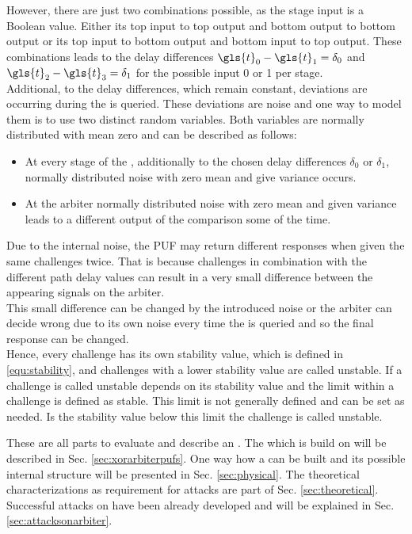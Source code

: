 However, there are just two combinations possible, as the stage input is a Boolean value.
Either its top input to top output and bottom output to bottom output or its top input to bottom output and bottom input to top output.
These combinations leads to the delay differences $\gls{t}_0 - \gls{t}_1 = \delta_0$ and $\gls{t}_2 - \gls{t}_3 = \delta_1$ for the possible input 0 or 1 per stage.\\
Additional, to the delay differences, which remain constant, deviations are occurring during the \apuf is queried.
These deviations are noise and one way to model them is to use two distinct random variables.
Both variables are normally distributed with mean zero and can be described as follows:

\begin{itemize}
\item At every stage of the \apuf, additionally to the chosen delay differences $\delta_0$ or $\delta_1$, normally distributed noise with zero mean and give variance occurs.
\item At the arbiter normally distributed noise with zero mean and given variance leads to a different output of the comparison some of the time.
\end{itemize}

Due to the internal noise, the PUF may return different responses when given the same challenges twice.
That is because challenges in combination with the different path delay values can result in a very small difference between the appearing signals on the arbiter.\\
This small difference can be changed by the introduced noise or the arbiter can decide wrong due to its own noise every time the \apuf is queried and so the final response can be changed.\\
Hence, every challenge has its own stability value, which is defined in \ref{equ:stability}, and challenges with a lower stability value are called unstable.
If a challenge is called unstable depends on its stability value and the limit within a challenge is defined as stable.
This limit is not generally defined and can be set as needed.
Is the stability value below this limit the challenge is called unstable.

These are all parts to evaluate and describe an \apuf.
The \xpuf which is build on \apufs will be described in Sec. \ref{sec:xorarbiterpufs}.
One way how a \apuf can be built and its possible internal structure will be presented in Sec. \ref{sec:physical}.
The theoretical characterizations as requirement for attacks are part of Sec. \ref{sec:theoretical}.
Successful attacks on \apufs have been already developed and will be explained in Sec. \ref{sec:attacksonarbiter}.

